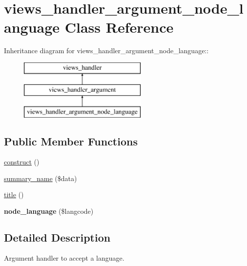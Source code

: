 \hypertarget{classviews__handler__argument__node__language}{
\section{views\_\-handler\_\-argument\_\-node\_\-language Class Reference}
\label{classviews__handler__argument__node__language}
}
Inheritance diagram for views\_\-handler\_\-argument\_\-node\_\-language::\begin{figure}[H]
\begin{center}
\leavevmode
\includegraphics[height=3cm]{classviews__handler__argument__node__language}
\end{center}
\end{figure}
\subsection*{Public Member Functions}
\begin{DoxyCompactItemize}
\item 
\hyperlink{classviews__handler__argument__node__language_a96f52469109294ad151b3ca21c261795}{construct} ()
\item 
\hyperlink{classviews__handler__argument__node__language_aa07770dbbc40710c5369f76f4d4b6a35}{summary\_\-name} (\$data)
\item 
\hyperlink{classviews__handler__argument__node__language_ab880be769744ec720d0b8e2e32671daa}{title} ()
\item 
\hypertarget{classviews__handler__argument__node__language_a903323823eed9d3410b74bd3a6ca1ea8}{
{\bfseries node\_\-language} (\$langcode)}
\label{classviews__handler__argument__node__language_a903323823eed9d3410b74bd3a6ca1ea8}

\end{DoxyCompactItemize}


\subsection{Detailed Description}
Argument handler to accept a language. 

